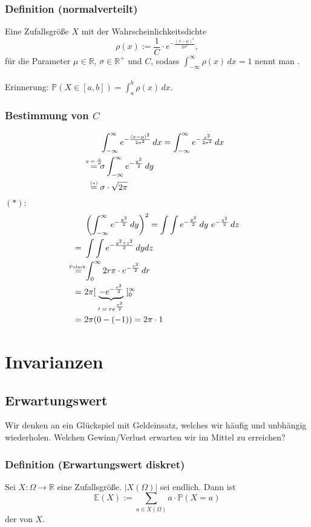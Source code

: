 \subsubsection{Definition (normalverteilt)}
Eine Zufallsgr\"o\ss{}e $X$ mit der Wahrscheinlichkeitsdichte
\[\rho(x):=\frac{1}{C}\cdot e^{-\frac{(x-\mu)^2}{2\sigma^{2}}},\]
f\"ur die Parameter $\mu\in\mathbb{R}$, $\sigma\in\mathbb{R}^+$ und $C$, sodass $\int_{-\infty}^{\infty}\rho(x)\,dx=1$ nennt man .
\\~\\
Erinnerung: $\mathbb{P}(X\in[a,b])=\int_a^b\rho(x)\,dx$.
\subsubsection{Bestimmung von $C$}
\begin{align*}
    &\int_{-\infty}^{\infty}e^{-\frac{(x-\mu)^2}{2\sigma^2}}\,dx
    =\int_{-\infty}^{\infty}e^{-\frac{x^2}{2\sigma^2}}\,dx
    \\\textabove{$y=\frac{x}{\sigma}$}{=}\ &\sigma\int_{-\infty}^{\infty}e^{-\frac{y^2}{2}}\,dy
    \\\textabove{$(*)$}{=}\ &\sigma\cdot\sqrt{2\pi}
\end{align*}
$(*)$:
\begin{align*}
    &\left(\int_{-\infty}^{\infty}e^{-\frac{y^2}{2}}\,dy\right)^2=\int\int e^{-\frac{y^2}{2}}\,dy\ e^{-\frac{z^2}{2}}\,dz
    \\=\ &\int\int e^{-\frac{y^2+z^2}{2}}\,dydz
    \\\textabove{Polark.}{=}\ &\int_{0}^{\infty}2r\pi\cdot e^{-\frac{r^2}{2}}\,dr
    \\=\ &2\pi[\ \ubr{-e^{-\frac{r^2}{2}}}{$\prime=re^{\frac{r^2}{2}}$}\ ]_0^\infty
    \\=\ &2\pi(0-(-1))=2\pi\cdot1
\end{align*}
\section{Invarianzen}
\subsection{Erwartungswert}
Wir denken an ein Gl\"uckspiel mit Geldeinsatz, welches wir h\"aufig und unbh\"angig wiederholen. Welchen Gewinn/Verlust erwarten wir im Mittel zu erreichen?
\subsubsection{Definition (Erwartungswert diskret)}
Sei $X\colon\Omega\to\mathbb{R}$ eine Zufallsgr\"o\ss{}e. $|X(\Omega)|$ sei endlich. Dann ist
\[\mathbb{E}(X):=\sum_{a\in X(\Omega)}a\cdot\mathbb{P}(X=a)\]
der  von $X$.
